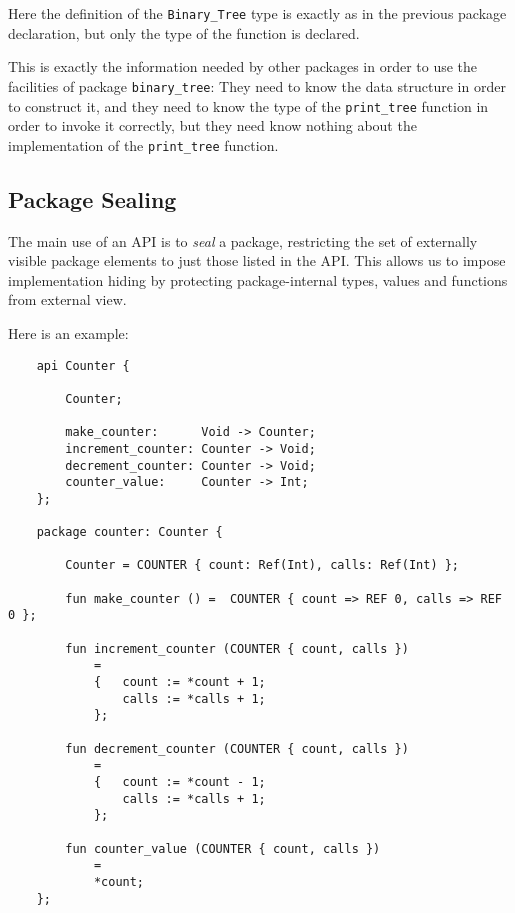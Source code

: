 Here the definition of the {\tt Binary\_Tree} type is exactly  
as in the previous package declaration, but only the type of 
the function is declared.

This is exactly the information 
needed by other packages in order to use the facilities of 
package {\tt binary\_tree}:  They need to know the data structure 
in order to construct it, and they need to know the type of the 
{\tt print\_tree} function in order to invoke it correctly, but 
they need know nothing about the implementation of the {\tt print\_tree} function.


\cutend*

\subsection{Package Sealing}
\label{section:ref:package-sealing}

The main use of an API is to {\it seal} a package, 
restricting the set of externally visible package 
elements to just those listed in the API.  This 
allows us to impose implementation hiding by 
protecting package-internal types, values and 
functions from external view.

Here is an example:

\begin{verbatim}
    api Counter {

        Counter;

        make_counter:      Void -> Counter;
        increment_counter: Counter -> Void;
        decrement_counter: Counter -> Void;
        counter_value:     Counter -> Int; 
    };

    package counter: Counter {

        Counter = COUNTER { count: Ref(Int), calls: Ref(Int) };

        fun make_counter () =  COUNTER { count => REF 0, calls => REF 0 };

        fun increment_counter (COUNTER { count, calls })
            =
            {   count := *count + 1;
                calls := *calls + 1;
            };

        fun decrement_counter (COUNTER { count, calls })
            =
            {   count := *count - 1;
                calls := *calls + 1;
            };

        fun counter_value (COUNTER { count, calls })
            =
            *count;
    };

\end{verbatim}

